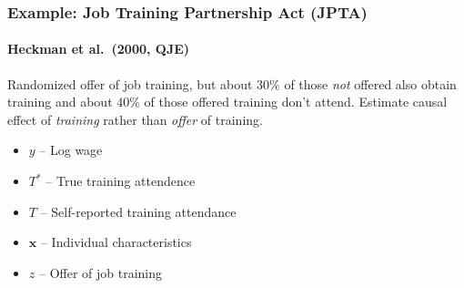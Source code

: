 \documentclass{beamer}
\begin{document}
\begin{frame}
  \frametitle{Example: Job Training Partnership Act (JPTA)}
\framesubtitle{Heckman et al.\ (2000, QJE)}
Randomized offer of job training, but about $30\%$ of those \emph{not} offered also obtain training and about $40\%$ of those offered training don't attend. Estimate causal effect of \emph{training} rather than \emph{offer} of training.

\begin{itemize}
  \item $y$ -- Log wage 
  \item $T^*$ -- True training attendence
  \item $T$ -- Self-reported training attendance
  \item $\mathbf{x}$ -- Individual characteristics
  \item $z$ -- Offer of job training
\end{itemize}
   
\end{frame}
%
\end{document}
